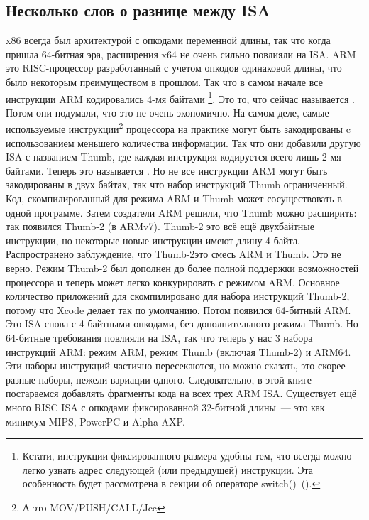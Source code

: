 \subsection{Несколько слов о разнице между \ac{ISA}}
x86 всегда был архитектурой с опкодами переменной длины, так что когда пришла 64-битная эра, расширения x64 не очень сильно повлияли на \ac{ISA}.
ARM это \ac{RISC}-процессор разработанный с учетом опкодов одинаковой длины, что было некоторым преимуществом в прошлом.
Так что в самом начале все инструкции ARM кодировались 4-мя байтами%
\footnote{
Кстати, инструкции фиксированного размера удобны тем, что всегда можно легко узнать адрес 
следующей (или предыдущей) инструкции. Эта особенность будет рассмотрена в секции об операторе switch()~().
}.
Это то, что сейчас называется .
Потом они подумали, что это не очень экономично.
На самом деле, самые используемые инструкции\footnote{А это MOV/PUSH/CALL/Jcc} процессора на практике могут быть закодированы c использованием меньшего количества информации.
Так что они добавили другую \ac{ISA} с названием Thumb, где каждая инструкция кодируется всего лишь 2-мя байтами.
Теперь это называется .
Но не все инструкции ARM могут быть закодированы в двух байтах, так что набор инструкций Thumb ограниченный.
Код, скомпилированный для режима ARM и Thumb может сосуществовать в одной программе.
Затем создатели ARM решили, что Thumb можно расширить: так появился Thumb-2 (в ARMv7).
Thumb-2 это всё ещё двухбайтные инструкции, но некоторые новые инструкции имеют длину 4 байта.
Распространено заблуждение, что Thumb-2\EMDASH{}это смесь ARM и Thumb. Это не верно. Режим Thumb-2 был дополнен до
более полной поддержки возможностей процессора и теперь может легко конкурировать с режимом ARM.
Основное количество приложений для \idevices скомпилировано для набора инструкций Thumb-2, потому что Xcode
делает так по умолчанию.
Потом появился 64-битный ARM. Это \ac{ISA} снова с 4-байтными опкодами, без дополнительного режима Thumb.
Но 64-битные требования повлияли на \ac{ISA}, так что теперь у нас 3 набора инструкций ARM: режим ARM, режим Thumb (включая Thumb-2) и ARM64.
Эти наборы инструкций частично пересекаются, но можно сказать, это скорее разные наборы, нежели вариации одного.
Следовательно, в этой книге постараемся добавлять фрагменты кода на всех трех ARM \ac{ISA}.
%
%
%
Существует ещё много \ac{RISC} \ac{ISA} с опкодами фиксированной 32-битной длины~--- это как минимум MIPS, PowerPC и Alpha AXP.
